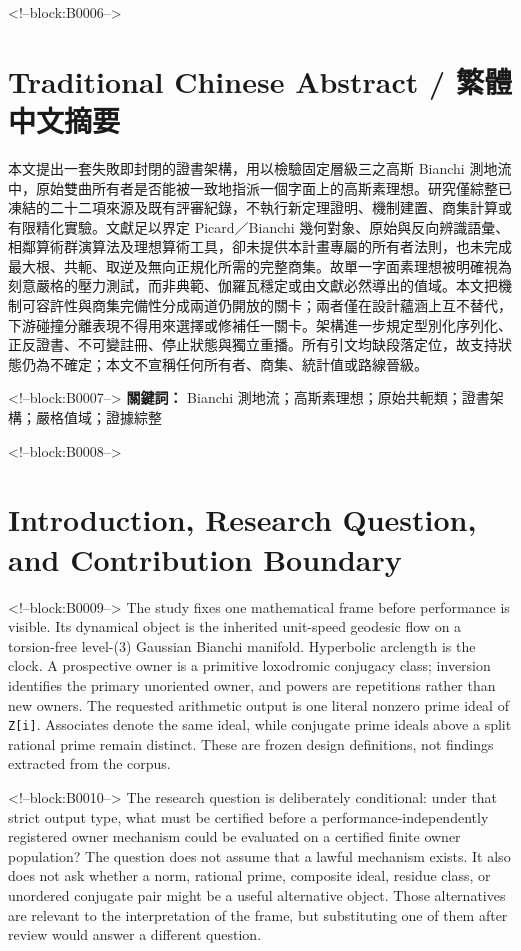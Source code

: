 \documentclass[11pt,a4paper]{article}
\begin{document}
<!--block:B0006-->
\begin{otherlanguage}{chinese-traditional}
\section*{Traditional Chinese Abstract / 繁體中文摘要}
本文提出一套失敗即封閉的證書架構，用以檢驗固定層級三之高斯 Bianchi 測地流中，原始雙曲所有者是否能被一致地指派一個字面上的高斯素理想。研究僅綜整已凍結的二十二項來源及既有評審紀錄，不執行新定理證明、機制建置、商集計算或有限精化實驗。文獻足以界定 Picard／Bianchi 幾何對象、原始與反向辨識語彙、相鄰算術群演算法及理想算術工具，卻未提供本計畫專屬的所有者法則，也未完成最大根、共軛、取逆及無向正規化所需的完整商集。故單一字面素理想被明確視為刻意嚴格的壓力測試，而非典範、伽羅瓦穩定或由文獻必然導出的值域。本文把機制可容許性與商集完備性分成兩道仍開放的關卡；兩者僅在設計蘊涵上互不替代，下游碰撞分離表現不得用來選擇或修補任一關卡。架構進一步規定型別化序列化、正反證書、不可變註冊、停止狀態與獨立重播。所有引文均缺段落定位，故支持狀態仍為不確定；本文不宣稱任何所有者、商集、統計值或路線晉級。

<!--block:B0007-->
\noindent\textbf{關鍵詞：} Bianchi 測地流；高斯素理想；原始共軛類；證書架構；嚴格值域；證據綜整
\end{otherlanguage}

<!--block:B0008-->
\section{Introduction, Research Question, and Contribution Boundary}

<!--block:B0009-->
The study fixes one mathematical frame before performance is visible. Its dynamical object is the inherited unit-speed geodesic flow on a torsion-free level-(3) Gaussian Bianchi manifold. Hyperbolic arclength is the clock. A prospective owner is a primitive loxodromic conjugacy class; inversion identifies the primary unoriented owner, and powers are repetitions rather than new owners. The requested arithmetic output is one literal nonzero prime ideal of \texttt{Z{[}i{]}}. Associates denote the same ideal, while conjugate prime ideals above a split rational prime remain distinct. These are frozen design definitions, not findings extracted from the corpus.

<!--block:B0010-->
The research question is deliberately conditional: under that strict output type, what must be certified before a performance-independently registered owner mechanism could be evaluated on a certified finite owner population? The question does not assume that a lawful mechanism exists. It also does not ask whether a norm, rational prime, composite ideal, residue class, or unordered conjugate pair might be a useful alternative object. Those alternatives are relevant to the interpretation of the frame, but substituting one of them after review would answer a different question.
\end{document}
